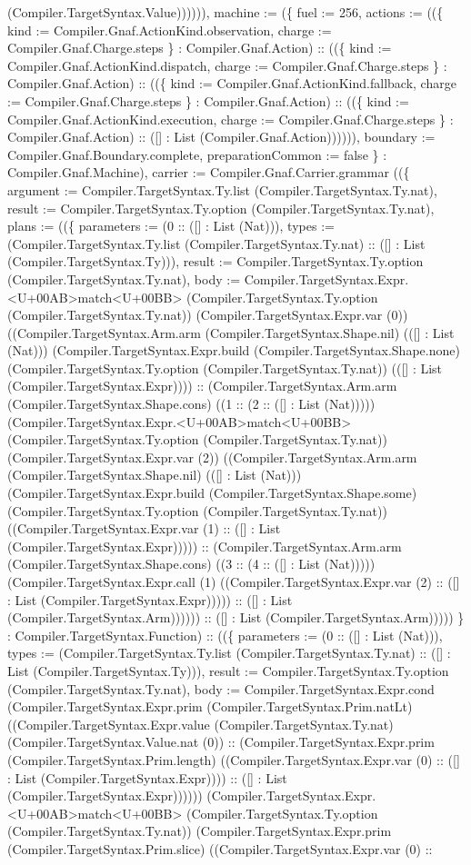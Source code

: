 \documentclass[11pt]{article}
\begin{document}
(Compiler.TargetSyntax.Value)))))), machine := (\{ fuel := 256, actions := ((\{ kind := Compiler.Gnaf.ActionKind.observation, charge := Compiler.Gnaf.Charge.steps \} : Compiler.Gnaf.Action) :: ((\{ kind := Compiler.Gnaf.ActionKind.dispatch, charge := Compiler.Gnaf.Charge.steps \} : Compiler.Gnaf.Action) :: ((\{ kind := Compiler.Gnaf.ActionKind.fallback, charge := Compiler.Gnaf.Charge.steps \} : Compiler.Gnaf.Action) :: ((\{ kind := Compiler.Gnaf.ActionKind.execution, charge := Compiler.Gnaf.Charge.steps \} : Compiler.Gnaf.Action) :: ([] : List (Compiler.Gnaf.Action)))))), boundary := Compiler.Gnaf.Boundary.complete, preparationCommon := false \} : Compiler.Gnaf.Machine), carrier := Compiler.Gnaf.Carrier.grammar ((\{ argument := Compiler.TargetSyntax.Ty.list (Compiler.TargetSyntax.Ty.nat), result := Compiler.TargetSyntax.Ty.option (Compiler.TargetSyntax.Ty.nat), plans := ((\{ parameters := (0 :: ([] : List (Nat))), types := (Compiler.TargetSyntax.Ty.list (Compiler.TargetSyntax.Ty.nat) :: ([] : List (Compiler.TargetSyntax.Ty))), result := Compiler.TargetSyntax.Ty.option (Compiler.TargetSyntax.Ty.nat), body := Compiler.TargetSyntax.Expr.<U+00AB>match<U+00BB> (Compiler.TargetSyntax.Ty.option (Compiler.TargetSyntax.Ty.nat)) (Compiler.TargetSyntax.Expr.var (0)) ((Compiler.TargetSyntax.Arm.arm (Compiler.TargetSyntax.Shape.nil) (([] : List (Nat))) (Compiler.TargetSyntax.Expr.build (Compiler.TargetSyntax.Shape.none) (Compiler.TargetSyntax.Ty.option (Compiler.TargetSyntax.Ty.nat)) (([] : List (Compiler.TargetSyntax.Expr)))) :: (Compiler.TargetSyntax.Arm.arm (Compiler.TargetSyntax.Shape.cons) ((1 :: (2 :: ([] : List (Nat))))) (Compiler.TargetSyntax.Expr.<U+00AB>match<U+00BB> (Compiler.TargetSyntax.Ty.option (Compiler.TargetSyntax.Ty.nat)) (Compiler.TargetSyntax.Expr.var (2)) ((Compiler.TargetSyntax.Arm.arm (Compiler.TargetSyntax.Shape.nil) (([] : List (Nat))) (Compiler.TargetSyntax.Expr.build (Compiler.TargetSyntax.Shape.some) (Compiler.TargetSyntax.Ty.option (Compiler.TargetSyntax.Ty.nat)) ((Compiler.TargetSyntax.Expr.var (1) :: ([] : List (Compiler.TargetSyntax.Expr))))) :: (Compiler.TargetSyntax.Arm.arm (Compiler.TargetSyntax.Shape.cons) ((3 :: (4 :: ([] : List (Nat))))) (Compiler.TargetSyntax.Expr.call (1) ((Compiler.TargetSyntax.Expr.var (2) :: ([] : List (Compiler.TargetSyntax.Expr))))) :: ([] : List (Compiler.TargetSyntax.Arm)))))) :: ([] : List (Compiler.TargetSyntax.Arm))))) \} : Compiler.TargetSyntax.Function) :: ((\{ parameters := (0 :: ([] : List (Nat))), types := (Compiler.TargetSyntax.Ty.list (Compiler.TargetSyntax.Ty.nat) :: ([] : List (Compiler.TargetSyntax.Ty))), result := Compiler.TargetSyntax.Ty.option (Compiler.TargetSyntax.Ty.nat), body := Compiler.TargetSyntax.Expr.cond (Compiler.TargetSyntax.Expr.prim (Compiler.TargetSyntax.Prim.natLt) ((Compiler.TargetSyntax.Expr.value (Compiler.TargetSyntax.Ty.nat) (Compiler.TargetSyntax.Value.nat (0)) :: (Compiler.TargetSyntax.Expr.prim (Compiler.TargetSyntax.Prim.length) ((Compiler.TargetSyntax.Expr.var (0) :: ([] : List (Compiler.TargetSyntax.Expr)))) :: ([] : List (Compiler.TargetSyntax.Expr)))))) (Compiler.TargetSyntax.Expr.<U+00AB>match<U+00BB> (Compiler.TargetSyntax.Ty.option (Compiler.TargetSyntax.Ty.nat)) (Compiler.TargetSyntax.Expr.prim (Compiler.TargetSyntax.Prim.slice) ((Compiler.TargetSyntax.Expr.var (0) :: 
\end{document}

